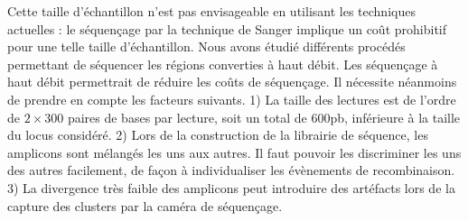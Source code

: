 Cette taille d'échantillon n'est pas envisageable en utilisant les techniques
actuelles : le séquençage par la technique de Sanger implique un coût prohibitif
pour une telle taille d'échantillon. Nous avons étudié différents procédés
permettant de séquencer les régions converties à haut débit. Les séquençage à
haut débit permettrait de réduire les coûts de séquençage. Il nécessite
néanmoins de prendre en compte les facteurs suivants. 1) La taille des lectures
est de l'ordre de \(2 \times 300\) paires de bases par lecture, soit un total de
\(600\)pb, inférieure à la taille du locus considéré. 2) Lors de la
construction de la librairie de séquence, les amplicons sont mélangés les uns
aux autres. Il faut pouvoir les discriminer les uns des autres facilement, de
façon à individualiser les évènements de recombinaison. 3) La divergence très
faible des amplicons peut introduire des artéfacts lors de la capture des
clusters par la caméra de séquençage.




\afterpage{\blankpage}
